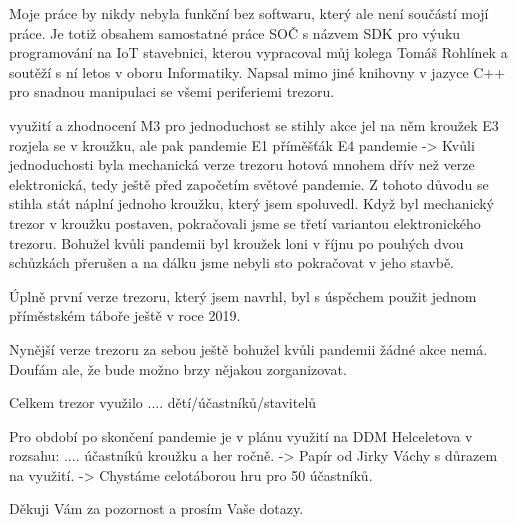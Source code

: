     Moje práce by nikdy nebyla funkční bez softwaru, který ale není součástí mojí práce. Je totiž obsahem samostatné práce SOČ
    s názvem SDK pro výuku programování na IoT stavebnici, %
    kterou vypracoval můj kolega Tomáš Rohlínek a soutěží s ní letos v oboru Informatiky.
    Napsal mimo jiné knihovny v jazyce C++ pro snadnou manipulaci se všemi periferiemi trezoru.

využití a zhodnocení
{
    M3
        pro jednoduchost se stihly akce
        jel na něm kroužek
    E3
        rozjela se v kroužku, ale pak pandemie
    E1
        příměšťák
    E4
        pandemie
}-> Kvůli jednoduchosti byla mechanická verze trezoru hotová mnohem dřív než verze elektronická, tedy ještě před započetím světové pandemie.
    Z tohoto důvodu se stihla stát náplní jednoho kroužku, který jsem spoluvedl. Když byl mechanický trezor v kroužku postaven,
     pokračovali jsme se třetí variantou elektronického 
    trezoru. Bohužel kvůli pandemii byl kroužek loni v říjnu po pouhých dvou schůzkách přerušen 
    a na dálku jsme nebyli sto pokračovat v jeho stavbě.

    Úplně první verze trezoru, který jsem navrhl, byl s úspěchem použit jednom příměstském táboře ještě v roce 2019.

    Nynější verze trezoru za sebou ještě bohužel kvůli pandemii žádné akce nemá. Doufám ale, že bude možno brzy nějakou zorganizovat.

    Celkem trezor využilo .... dětí/účastníků/stavitelů 

    Pro období po skončení pandemie je v plánu využití na DDM Helceletova v rozsahu: .... účastníků kroužku a her ročně. 
    -> Papír od Jirky Váchy s důrazem na využití.  %
    -> Chystáme celotáborou hru pro 50 účastníků. 

Děkuji Vám za pozornost a prosím Vaše dotazy. 